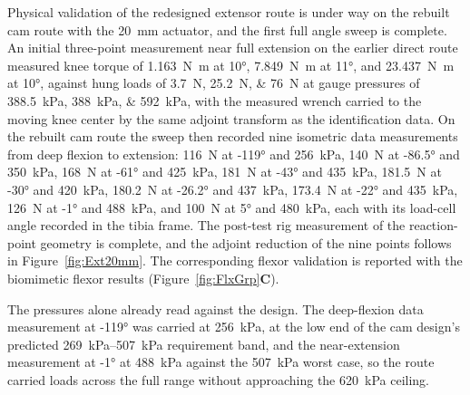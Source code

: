 \documentclass[utf8]{FrontiersinHarvard} %
\begin{document}
Physical validation of the redesigned extensor route is under way on the rebuilt cam route with the \qty{20}{\mm} actuator, and the first full angle sweep is complete. An initial three-point measurement near full extension on the earlier direct route measured knee torque of \qty{1.163}{\newton\meter} at \ang{10}, \qty{7.849}{\newton\meter} at \ang{11}, and \qty{23.437}{\newton\meter} at \ang{10}, against hung loads of \qtylist{3.7;25.2;76}{\newton} at gauge pressures of \qtylist{388.5;388;592}{\kPa}, with the measured wrench carried to the moving knee center by the same adjoint transform as the identification data. On the rebuilt cam route the sweep then recorded nine isometric data measurements from deep flexion to extension: \qty{116}{\newton} at \ang{-119} and \qty{256}{\kPa}, \qty{140}{\newton} at \ang{-86.5} and \qty{350}{\kPa}, \qty{168}{\newton} at \ang{-61} and \qty{425}{\kPa}, \qty{181}{\newton} at \ang{-43} and \qty{435}{\kPa}, \qty{181.5}{\newton} at \ang{-30} and \qty{420}{\kPa}, \qty{180.2}{\newton} at \ang{-26.2} and \qty{437}{\kPa}, \qty{173.4}{\newton} at \ang{-22} and \qty{435}{\kPa}, \qty{126}{\newton} at \ang{-1} and \qty{488}{\kPa}, and \qty{100}{\newton} at \ang{5} and \qty{480}{\kPa}, each with its load-cell angle recorded in the tibia frame. The post-test rig measurement of the reaction-point geometry is complete, and the adjoint reduction of the nine points follows in Figure~\ref{fig:Ext20mm}. The corresponding flexor validation is reported with the biomimetic flexor results (Figure~\ref{fig:FlxGrp}\textbf{C}).

The pressures alone already read against the design. The deep-flexion data measurement at \ang{-119} was carried at \qty{256}{\kPa}, at the low end of the cam design's predicted \qtyrange{269}{507}{\kPa} requirement band, and the near-extension measurement at \ang{-1} at \qty{488}{\kPa} against the \qty{507}{\kPa} worst case, so the route carried loads across the full range without approaching the \qty{620}{\kPa} ceiling.
\end{document}
